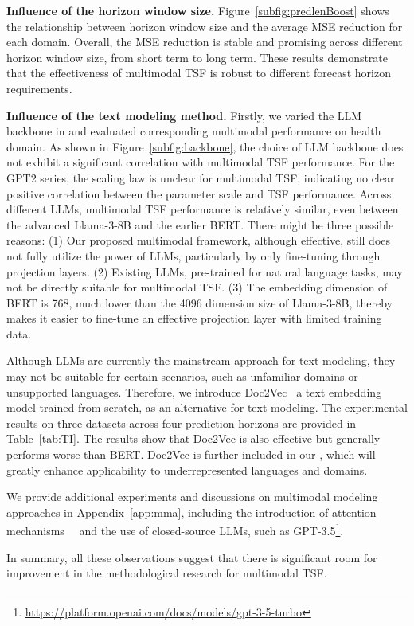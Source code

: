 \par \noindent \textbf{Influence of the horizon window size.} Figure~\ref{subfig:predlenBoost} shows the relationship between horizon window size and the average MSE reduction for each domain. 
Overall, the MSE reduction is stable and promising across different horizon window size, from short term to long term. These results demonstrate that the effectiveness of multimodal TSF is robust to different forecast horizon requirements.
\par \noindent \textbf{Influence of the text modeling method.} Firstly, we varied the LLM backbone in \mmtsf and evaluated corresponding multimodal performance on health domain. As shown in Figure~\ref{subfig:backbone}, the choice of LLM backbone does not exhibit a significant correlation with multimodal TSF performance. For the GPT2 series, the scaling law is unclear for multimodal TSF, indicating no clear positive correlation between the parameter scale and TSF performance. Across different LLMs, multimodal TSF performance is relatively similar, even between the advanced Llama-3-8B and the earlier BERT. There might be three possible reasons:
(1) Our proposed multimodal framework, although effective, still does not fully utilize the power of LLMs, particularly by only fine-tuning through projection layers. (2) Existing LLMs, pre-trained for natural language tasks, may not be directly suitable for multimodal TSF. (3) The embedding dimension of BERT is 768, much lower than the 4096 dimension size of Llama-3-8B, thereby makes it easier to fine-tune an effective projection layer with limited training data. 

Although LLMs are currently the mainstream approach for text modeling, they may not be suitable for certain scenarios, such as unfamiliar domains or unsupported languages. Therefore, we introduce Doc2Vec~\cite{le2014distributed} a text embedding model trained from scratch, as an alternative for text modeling. The experimental results on three datasets across four prediction horizons are provided in Table~\ref{tab:TI}. The results show that Doc2Vec is also effective but generally performs worse than BERT. Doc2Vec is further included in our \mmtsf, which will greatly enhance applicability to underrepresented languages and domains. 

We provide additional experiments and discussions on multimodal modeling approaches in Appendix~\ref{app:mma}, including the introduction of attention mechanisms~~\cite{vaswani2017attention} and the use of closed-source LLMs, such as GPT-3.5\footnote{\url{https://platform.openai.com/docs/models/gpt-3-5-turbo}}.

In summary, all these observations suggest that there is significant room for improvement in the methodological research for multimodal TSF.
